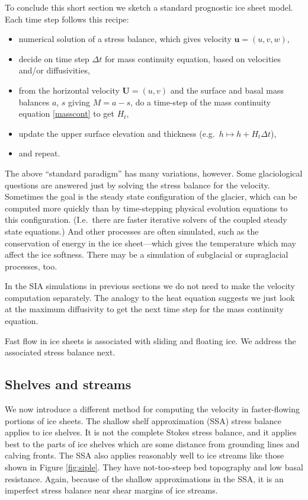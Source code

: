 \documentclass[titlepage,letterpaper,final,12pt]{scrartcl}
\begin{document}
To conclude this short section we sketch a standard prognostic ice sheet model.  Each time step follows this recipe:
  \begin{itemize}
  \item numerical solution of a stress balance, which gives velocity $\mathbf{u}=(u,v,w)$,
  \item decide on time step $\Delta t$ for mass continuity equation, based on velocities and/or diffusivities,
  \item from the horizontal velocity $\mathbf{U}=(u,v)$ and the surface and basal mass balances $a$, $s$ giving $M=a-s$, do a time-step of the mass continuity equation \eqref{masscont} to get $H_t$,
  \item update the upper surface elevation and thickness (e.g.~$h \mapsto h + H_t \Delta t$),
  \item and repeat.
  \end{itemize}

The above ``standard paradigm'' has many variations, however.  Some glaciological questions are answered just by solving the stress balance for the velocity.  Sometimes the goal is the steady state configuration of the glacier, which can be computed more quickly than by time-stepping physical evolution equations to this configuration.  (I.e.~there are faster iterative solvers of the coupled steady state equations.)  And other processes are often simulated, such as the conservation of energy in the ice sheet---which gives the temperature which may affect the ice softness.  There may be a simulation of subglacial or supraglacial processes, too.

In the SIA simulations in previous sections we do not need to make the velocity computation separately.  The analogy to the heat equation suggests we just look at the maximum diffusivity to get the next time step for the mass continuity equation.

Fast flow in ice sheets is associated with sliding and floating ice.  We address the associated stress balance next.


\subsection{Shelves and streams} \label{sec:shelvesandstreams}

We now introduce a different method for computing the velocity in faster-flowing portions of ice sheets.  The shallow shelf approximation (SSA) stress balance applies to ice shelves.  It is not the complete Stokes stress balance, and it applies best to the parts of ice shelves which are some distance from grounding lines and calving fronts.  The SSA also applies reasonably well to ice streams like those shown in Figure \ref{fig:siple}.  They have not-too-steep bed topography and low basal resistance.  Again, because of the shallow approximations in the SSA, it is an imperfect stress balance near shear margins of ice streams.
\end{document}
